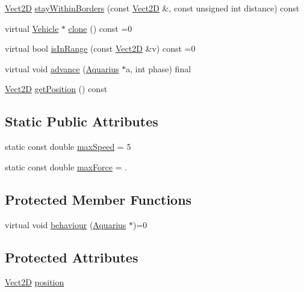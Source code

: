 \begin{DoxyCompactItemize}
\item 
\hyperlink{classVect2D}{Vect2D} \hyperlink{classVehicle_a6149abf3e3f67df45d950562034d0fae_a6149abf3e3f67df45d950562034d0fae}{stay\+Within\+Borders} (const \hyperlink{classVect2D}{Vect2D} \&, const unsigned int distance) const
\item 
virtual \hyperlink{classVehicle}{Vehicle} $\ast$ \hyperlink{classVehicle_a6c8513134608499d188a2e994accdb7c_a6c8513134608499d188a2e994accdb7c}{clone} () const =0
\item 
virtual bool \hyperlink{classVehicle_a49a29a7ce993a33f78b96e7b368c60fd_a49a29a7ce993a33f78b96e7b368c60fd}{is\+In\+Range} (const \hyperlink{classVect2D}{Vect2D} \&v) const =0
\item 
virtual void \hyperlink{classVehicle_aa4ffd7e5fd11297950347de4e8b5ec93_aa4ffd7e5fd11297950347de4e8b5ec93}{advance} (\hyperlink{classAquarius}{Aquarius} $\ast$a, int phase) final
\item 
\hyperlink{classVect2D}{Vect2D} \hyperlink{classCartesianObject2D_aa3a6b63777852ab9eb9408ed2536abe2_aa3a6b63777852ab9eb9408ed2536abe2}{get\+Position} () const
\end{DoxyCompactItemize}
\subsection*{Static Public Attributes}
\begin{DoxyCompactItemize}
\item 
static const double \hyperlink{classVehicle_aab47c62e89baa5b7e52c2292451fbcb6_aab47c62e89baa5b7e52c2292451fbcb6}{max\+Speed} = 5
\item 
static const double \hyperlink{classVehicle_a95c56790e3dc52ab0fa54c279920be54_a95c56790e3dc52ab0fa54c279920be54}{max\+Force} = .
\end{DoxyCompactItemize}
\subsection*{Protected Member Functions}
\begin{DoxyCompactItemize}
\item 
virtual void \hyperlink{classVehicle_a7b8b7578202a306a4dc08d587dc70f17_a7b8b7578202a306a4dc08d587dc70f17}{behaviour} (\hyperlink{classAquarius}{Aquarius} $\ast$)=0
\end{DoxyCompactItemize}
\subsection*{Protected Attributes}
\begin{DoxyCompactItemize}
\item 
\hyperlink{classVect2D}{Vect2D} \hyperlink{classCartesianObject2D_ae02ec6ed11f9bfc0c748da033d6a32f9_ae02ec6ed11f9bfc0c748da033d6a32f9}{position}
\end{DoxyCompactItemize}

